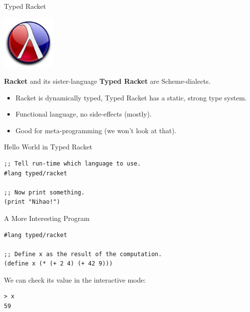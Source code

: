 \documentclass{beamer}
\begin{document}
\begin{frame}{Typed Racket}

  \begin{center}
    \includegraphics[width=0.2\textwidth]{racket.png}
  \end{center}

  \textbf{Racket} and its sister-language \textbf{Typed Racket} are Scheme-dialects.

  \begin{itemize}
  \pause{} \item Racket is dynamically typed, Typed Racket has a static, strong type system.
  \pause{} \item Functional language, no side-effects (mostly).
  \pause{} \item Good for meta-programming (we won't look at that).
  \end{itemize}
\end{frame}

\begin{frame}[fragile]{Hello World in Typed Racket}
\begin{center}
\begin{lstlisting}
;; Tell run-time which language to use.
#lang typed/racket

;; Now print something.
(print "Nihao!")
\end{lstlisting}
\end{center}
\end{frame}

\begin{frame}[fragile]{A More Interesting Program}
\begin{lstlisting}
#lang typed/racket

;; Define x as the result of the computation.
(define x (* (+ 2 4) (+ 42 9)))
\end{lstlisting}

\pause{}

We can check its value in the interactive mode:

\begin{lstlisting}
> x
59
\end{lstlisting}

\end{frame}
\end{document}
